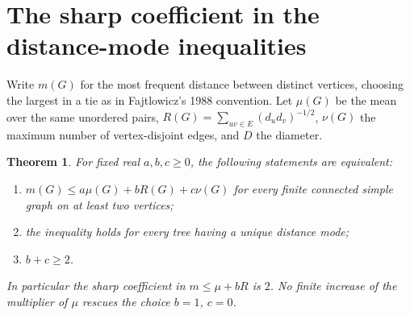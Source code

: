 \documentclass[11pt,a4paper]{article}
\newtheorem{theorem}{Theorem}[section]
\begin{document}
\section{The sharp coefficient in the distance-mode inequalities}\label{sec:sharp-mode}
Write $m(G)$ for the most frequent distance between distinct vertices, choosing the largest in a tie as in Fajtlowicz's 1988 convention. Let $\mu(G)$ be the mean over the same unordered pairs, $R(G)=\sum_{uv\in E}(d_ud_v)^{-1/2}$, $\nu(G)$ the maximum number of vertex-disjoint edges, and $D$ the diameter.
\begin{theorem}\label{thm:modecone}
For fixed real $a,b,c\ge0$, the following statements are equivalent:
\begin{enumerate}
\item $m(G)\le a\mu(G)+bR(G)+c\nu(G)$ for every finite connected simple graph on at least two vertices;
\item the inequality holds for every tree having a unique distance mode;
\item $b+c\ge2$.
\end{enumerate}
In particular the sharp coefficient in $m\le\mu+bR$ is $2$. No finite increase of the multiplier of $\mu$ rescues the choice $b=1$, $c=0$.
\end{theorem}
\end{document}
